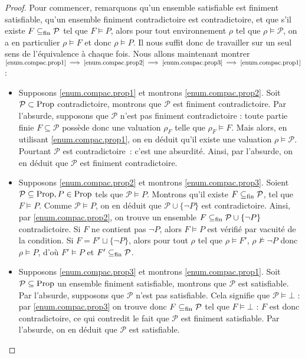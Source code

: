 \begin{proof}
  Pour commencer, remarquons qu'un ensemble satisfiable est finiment
  satisfiable, qu'un ensemble finiment contradictoire est contradictoire, et que
  s'il existe $F\subseteq_{\mathrm{fin}} \mathcal P$ tel que $F\vDash P$, alors pour tout
  environnement $\rho$ tel que $\rho\models \mathcal P$, on a en particulier
  $\rho\models F$ et donc $\rho\models P$. Il nous suffit donc de travailler sur
  un seul sens de l'équivalence à chaque fois. Nous allons maintenant montrer
  $\ref{enum.compac.prop1}\implies\ref{enum.compac.prop2}\implies
  \ref{enum.compac.prop3}\implies\ref{enum.compac.prop1}$ :
  \begin{itemize}
  \item Supposons \ref{enum.compac.prop1} et montrons \ref{enum.compac.prop2}.
    Soit $\mathcal P\subset \operatorname{Prop}$ contradictoire, montrons que $\mathcal P$
    est finiment contradictoire. Par l'absurde, supposons que $\mathcal P$ n'est
    pas finiment contradictoire : toute partie finie $F\subseteq \mathcal P$
    possède donc une valuation $\rho_F$ telle que $\rho_F\models F$. Mais alors,
    en utilisant \ref{enum.compac.prop1}, on en déduit qu'il existe une
    valuation $\rho\models \mathcal P$. Pourtant $\mathcal P$ est
    contradictoire~: c'est une absurdité. Ainsi, par l'absurde, on en déduit que
    $\mathcal P$ est finiment contradictoire.
  \item Supposons \ref{enum.compac.prop2} et montrons \ref{enum.compac.prop3}.
    Soient $\mathcal P\subseteq\operatorname{Prop}, P\in\operatorname{Prop}$ tels que $\mathcal P\vDash P$.
    Montrons qu'il existe $F\subseteq_{\mathrm{fin}}\mathcal P$, tel que $F\vDash P$. Comme
    $\mathcal P\vDash P$, on en déduit que $\mathcal P \cup \{\lnot P\}$ est
    contradictoire. Ainsi, par \ref{enum.compac.prop2}, on trouve un ensemble
    $F\subseteq_{\mathrm{fin}} \mathcal P \cup \{\lnot P\}$ contradictoire. Si $F$ ne contient
    pas $\lnot P$, alors $F\vDash P$ est vérifié par vacuité de la condition.
    Si $F = F' \sqcup \{\lnot P\}$, alors pour tout $\rho$ tel que
    $\rho\models F'$, $\rho\not\models \lnot P$ donc $\rho\models P$, d'où
    $F'\vDash P$ et $F'\subseteq_{\mathrm{fin}} \mathcal P$.
  \item Supposons \ref{enum.compac.prop3} et montrons \ref{enum.compac.prop1}.
    Soit $\mathcal P\subseteq\operatorname{Prop}$ un ensemble finiment satisfiable, montrons
    que $\mathcal P$ est satisfiable. Par l'absurde, supposons que $\mathcal P$
    n'est pas satisfiable. Cela signifie que $\mathcal P\vDash \bot$ : par
    \ref{enum.compac.prop3} on trouve donc $F\subseteq_{\mathrm{fin}} \mathcal P$ tel que
    $F\vDash \bot$ : $F$ est donc contradictoire, ce qui contredit le fait que
    $\mathcal P$ est finiment satisfiable. Par l'absurde, on en déduit que
    $\mathcal P$ est satisfiable.
  \end{itemize}
\end{proof}

